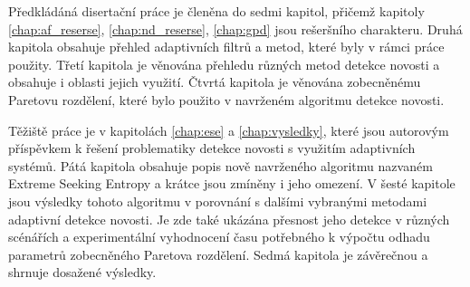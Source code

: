 Předkládáná disertační práce je členěna do sedmi kapitol, přičemž kapitoly \ref{chap:af_reserse}, \ref{chap:nd_reserse}, \ref{chap:gpd} jsou rešeršního charakteru. Druhá kapitola obsahuje přehled adaptivních filtrů a metod, které byly v rámci práce použity. Třetí kapitola je věnována přehledu různých metod detekce novosti a obsahuje i oblasti jejich využití.  Čtvrtá kapitola je věnována zobecněnému Paretovu rozdělení, které bylo použito v navrženém algoritmu detekce novosti.
\par  
Těžiště práce je v kapitolách \ref{chap:ese} a \ref{chap:vysledky}, které jsou autorovým příspěvkem k řešení problematiky detekce novosti s využitím adaptivních systémů.
Pátá kapitola obsahuje popis nově navrženého algoritmu nazvaném Extreme Seeking Entropy a krátce jsou zmíněny i jeho omezení. V šesté kapitole jsou výsledky tohoto algoritmu v porovnání s dalšími vybranými metodami adaptivní detekce novosti. Je zde také ukázána přesnost jeho detekce v různých scénářích a experimentální vyhodnocení času potřebného k výpočtu odhadu parametrů zobecněného Paretova rozdělení. Sedmá kapitola je závěrečnou a shrnuje dosažené výsledky.